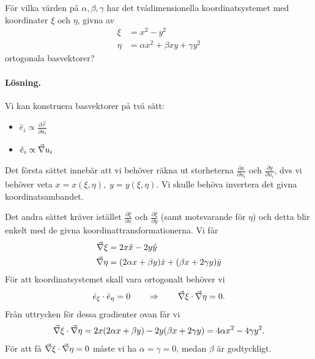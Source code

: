 \documentclass[%
oneside,                 %
final,                   %
10pt]{article}
\newenvironment{notice_mdfboxadmon}[1][]{
\begin{notice_mdfboxmdframed}[frametitle=#1]
}
{
\end{notice_mdfboxmdframed}
}
\begin{document}
\begin{notice_mdfboxadmon}
För vilka värden på $\alpha,\beta,\gamma$ har det tvådimensionella koordinatsystemet med koordinater $\xi$ och $\eta$, givna av
\begin{align}
\xi &= x^2 - y^2 \\ 
\eta &= \alpha x^2 + \beta x y + \gamma y^2
\end{align}
ortogonala basvektorer?

\paragraph{Lösning.}
Vi kan konstruera basvektorer på två sätt:
\begin{itemize}
\item $\hat{e}_i \propto \frac{\partial \vec{r}}{\partial u_i}$

\item $\hat{e}_i \propto \vec{\nabla} u_i$
\end{itemize}

\noindent
Det första sättet innebär att vi behöver räkna ut storheterna $\frac{\partial x}{\partial u_i}$ och $\frac{\partial y}{\partial u_i}$, dvs vi behöver veta $x=x(\xi,\eta),\; y=y(\xi,\eta)$. Vi skulle behöva invertera det givna koordinatsambandet.

Det andra sättet kräver istället $\frac{\partial \xi}{\partial x}$ och $\frac{\partial \xi}{\partial y}$ (samt motsvarande för $\eta$) och detta blir enkelt med de givna koordinattransformationerna. Vi får
\begin{align}
\vec{\nabla} \xi &= 2x \hat{x} - 2y \hat{y} \\ 
\vec{\nabla} \eta &= (2 \alpha x + \beta y)\hat{x} + (\beta x + 2 \gamma y) \hat{y}
\end{align}
För att koordinatsystemet skall vara ortogonalt behöver vi
\begin{equation}
\hat{e}_\xi \cdot \hat{e}_\eta = 0 \qquad \Rightarrow \qquad \vec{\nabla} \xi \cdot \vec{\nabla} \eta=0.
\end{equation}
Från uttrycken för dessa gradienter ovan får vi
\begin{equation}
\vec{\nabla} \xi \cdot \vec{\nabla} \eta = 2x (2 \alpha x + \beta y) - 2 y (\beta x + 2 \gamma y) 
= 4 \alpha x^2 - 4 \gamma y^2.
\end{equation}
För att få $\vec{\nabla} \xi \cdot \vec{\nabla} \eta=0$ måste vi ha $\alpha = \gamma = 0$, medan $\beta$ är godtyckligt.





\end{notice_mdfboxadmon}
\end{document}

